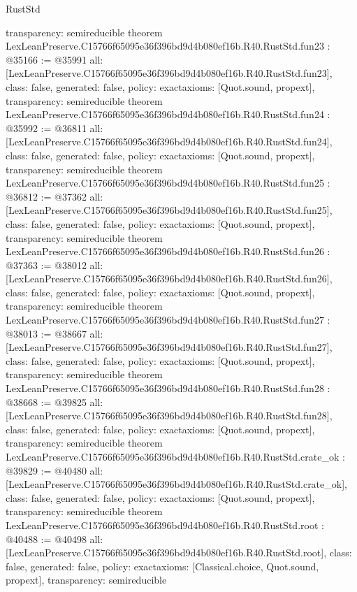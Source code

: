 \begin{lexlean}{RustStd}
\begin{coremodule}
{  transparency: semireducible
}
theorem LexLeanPreserve.C15766f65095e36f396bd9d4b080ef16b.R40.RustStd.fun23 : @35166 := @35991 {
  all: [LexLeanPreserve.C15766f65095e36f396bd9d4b080ef16b.R40.RustStd.fun23],
  class: false,
  generated: false,
  policy: exact{axioms: [Quot.sound, propext]},
  transparency: semireducible
}
theorem LexLeanPreserve.C15766f65095e36f396bd9d4b080ef16b.R40.RustStd.fun24 : @35992 := @36811 {
  all: [LexLeanPreserve.C15766f65095e36f396bd9d4b080ef16b.R40.RustStd.fun24],
  class: false,
  generated: false,
  policy: exact{axioms: [Quot.sound, propext]},
  transparency: semireducible
}
theorem LexLeanPreserve.C15766f65095e36f396bd9d4b080ef16b.R40.RustStd.fun25 : @36812 := @37362 {
  all: [LexLeanPreserve.C15766f65095e36f396bd9d4b080ef16b.R40.RustStd.fun25],
  class: false,
  generated: false,
  policy: exact{axioms: [Quot.sound, propext]},
  transparency: semireducible
}
theorem LexLeanPreserve.C15766f65095e36f396bd9d4b080ef16b.R40.RustStd.fun26 : @37363 := @38012 {
  all: [LexLeanPreserve.C15766f65095e36f396bd9d4b080ef16b.R40.RustStd.fun26],
  class: false,
  generated: false,
  policy: exact{axioms: [Quot.sound, propext]},
  transparency: semireducible
}
theorem LexLeanPreserve.C15766f65095e36f396bd9d4b080ef16b.R40.RustStd.fun27 : @38013 := @38667 {
  all: [LexLeanPreserve.C15766f65095e36f396bd9d4b080ef16b.R40.RustStd.fun27],
  class: false,
  generated: false,
  policy: exact{axioms: [Quot.sound, propext]},
  transparency: semireducible
}
theorem LexLeanPreserve.C15766f65095e36f396bd9d4b080ef16b.R40.RustStd.fun28 : @38668 := @39825 {
  all: [LexLeanPreserve.C15766f65095e36f396bd9d4b080ef16b.R40.RustStd.fun28],
  class: false,
  generated: false,
  policy: exact{axioms: [Quot.sound, propext]},
  transparency: semireducible
}
theorem LexLeanPreserve.C15766f65095e36f396bd9d4b080ef16b.R40.RustStd.crate_ok : @39829 := @40480 {
  all: [LexLeanPreserve.C15766f65095e36f396bd9d4b080ef16b.R40.RustStd.crate_ok],
  class: false,
  generated: false,
  policy: exact{axioms: [Quot.sound, propext]},
  transparency: semireducible
}
theorem LexLeanPreserve.C15766f65095e36f396bd9d4b080ef16b.R40.RustStd.root : @40488 := @40498 {
  all: [LexLeanPreserve.C15766f65095e36f396bd9d4b080ef16b.R40.RustStd.root],
  class: false,
  generated: false,
  policy: exact{axioms: [Classical.choice, Quot.sound, propext]},
  transparency: semireducible
}


\end{coremodule}
\end{lexlean}
